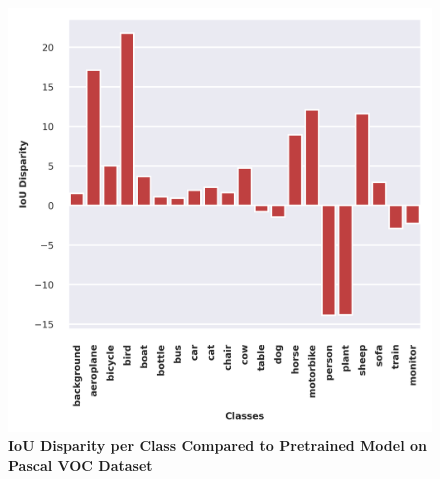



\begin{figure}[htb]
  \centering
  \includegraphics[width=0.9\linewidth, height=0.6\textheight]{figures/fig_plots/ioupascal.png}
  \caption{\textbf{IoU Disparity per Class Compared to Pretrained Model on Pascal VOC Dataset}}
  \label{fig:pcaclasses}
\end{figure}


